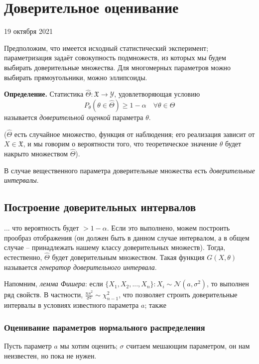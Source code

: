 \documentclass[main.tex]{subfiles}
\begin{document}
\section{Доверительное оценивание}
19 октября 2021

Предположим, что имеется исходный статистический эксперимент; параметризация задаёт совокупность подмножеств, из которых мы будем выбирать доверительные множества.
Для многомерных параметров можно выбирать прямоугольники, можно эллипсоиды.

\textbf{Определение.}
Статистика $ \hat \Theta : \mathfrak X \to \mathcal Y $, удовлетворяющая условию
\[ P_\theta (\theta \in \hat \Theta) \ge 1 - \alpha \quad \forall \theta \in \Theta  \]
называется \emph{доверительной оценкой} параметра $ \theta $.

($ \hat \Theta $ есть случайное множество, функция от наблюдения; его реализация зависит от $ X \in \mathfrak X $, и мы говорим о вероятности того, что теоретическое значение $ \theta $ будет накрыто множеством $ \hat \Theta $).


В случае вещественного параметра доверительные множества есть \emph{доверительные интервалы}.

\subsection{ Построение доверительных интервалов}

... что вероятность будет $ > 1 - \alpha $.
Если это выполнено, можем построить прообраз отображения (он должен быть в данном случае интервалом, а в общем случае -- принадлежать нашему классу доверительных множеств).
Тогда, естественно, $ \hat \Theta $ будет доверительным множеством.
Такая функция $ G(X, \theta) $ называется \emph{генератор доверительного интервала}.

Напомним, \emph{лемма Фишера}: если $ \{ X_1, X_2, ..., X_n \} : X_i \sim \mathcal N(a, \sigma^2) $, то выполнен ряд свойств.
В частности, $\frac{ns^2}{\sigma^2} \sim \chi^2_{n-1} $, что позволяет строить доверительные интервалы в условиях известного параметра $ a $; также %

\subsubsection{Оценивание параметров нормального распределения} 

Пусть параметр $ a $ мы хотим оценить; $ \sigma $ считаем мешающим параметром, он нам неизвестен, но пока не нужен.
\end{document}
